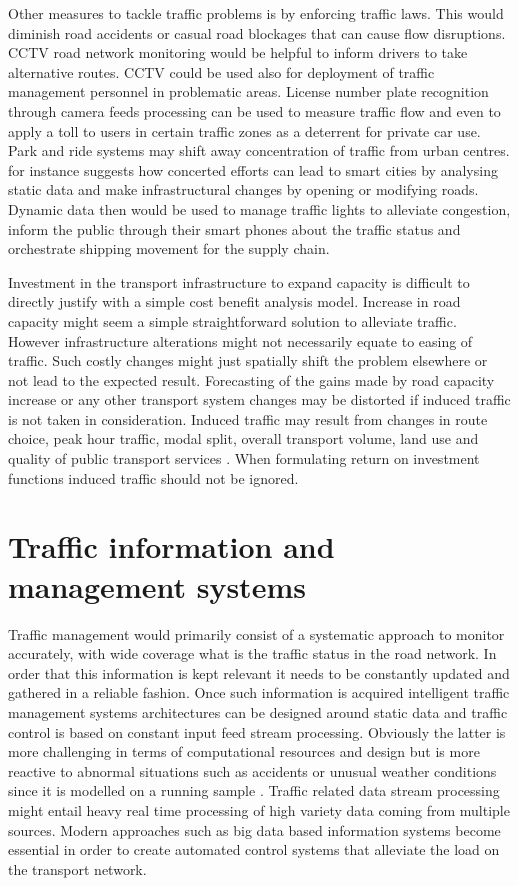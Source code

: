 \documentclass[12pt, a4paper]{report}
\theoremstyle{definition}
\theoremstyle{definition}%
\theoremstyle{definition}%
\theoremstyle{definition}%
\theoremstyle{definition}%
\theoremstyle{definition}%
\begin{document}
Other measures to tackle traffic problems is by enforcing traffic laws. This would diminish road accidents or casual road blockages that can cause flow disruptions. CCTV road network monitoring would be helpful to inform drivers to take alternative routes. CCTV could be used also for deployment of traffic management personnel in problematic areas. License number plate recognition through camera feeds processing can be used to measure traffic flow and even to apply a toll to users in certain traffic zones as a deterrent for private car use.  Park and ride systems may shift away concentration of traffic from urban centres.  \cite{AlNuaimi2015} for instance suggests how concerted efforts can lead to smart cities by analysing static data and make infrastructural changes by opening or modifying roads. Dynamic data then would be used to manage traffic lights to alleviate congestion, inform the public through their smart phones about the traffic status and orchestrate shipping movement for the supply chain.

Investment in the transport infrastructure to expand capacity is difficult to directly justify with a simple cost benefit analysis model. Increase in road capacity might seem a simple straightforward solution to alleviate traffic.  However infrastructure alterations might not necessarily equate to easing of traffic. Such costly changes might just spatially shift the problem elsewhere or not lead to the expected result. Forecasting of the gains made by road capacity increase or any other transport system changes may be distorted if induced traffic is not taken in consideration. Induced traffic may result from changes in route choice, peak hour traffic, modal split, overall transport volume, land use and quality of public transport services \cite{Naess2012}. When formulating return on investment functions induced traffic should not be ignored.


\section{Traffic information and management systems}\label{section:introduction:traffic_information_and_management_systems}

Traffic management would primarily consist of a systematic approach to monitor accurately, with wide coverage what is the traffic status in the road network. In order that this information is kept relevant it needs to be constantly updated and gathered in a reliable fashion. Once such information is acquired intelligent traffic management systems architectures can be designed around static data and traffic control is based  on constant input feed stream processing. Obviously the latter is more challenging in terms of computational resources and design but is more reactive to abnormal situations such as accidents or unusual weather conditions since it is modelled on a running sample \cite{Toole2015}. Traffic related data stream processing might entail heavy real time processing of high variety data coming from multiple sources. Modern approaches such as big data based information systems become essential in order to create automated control systems that alleviate the load on the transport network.
\end{document}
